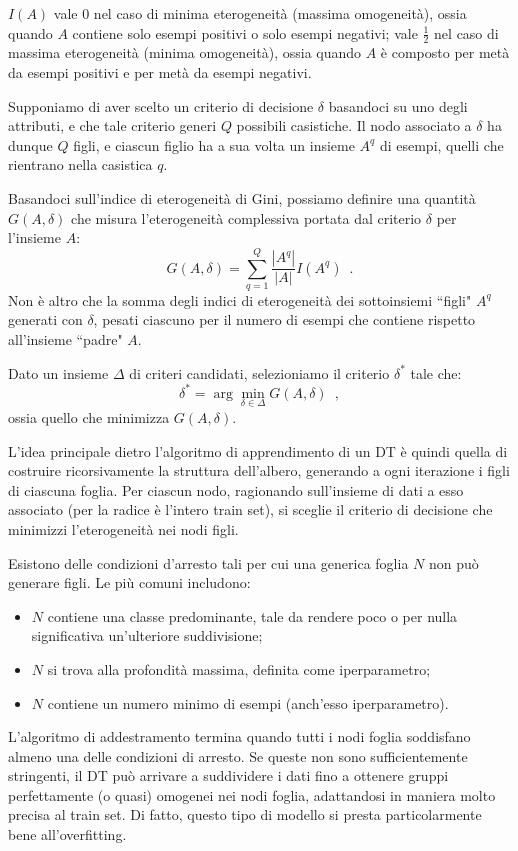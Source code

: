 $I(A)$ vale 0 nel caso di minima eterogeneità (massima omogeneità), ossia quando $A$ contiene solo esempi positivi o solo esempi negativi; vale $\frac{1}{2}$ nel caso di massima eterogeneità (minima omogeneità), ossia quando $A$ è composto per metà da esempi positivi e per metà da esempi negativi.

Supponiamo di aver scelto un criterio di decisione $\delta$ basandoci su uno degli attributi, e che tale criterio generi $Q$ possibili casistiche. Il nodo associato a $\delta$ ha dunque $Q$ figli, e ciascun figlio ha a sua volta un insieme $A^q$ di esempi, quelli che rientrano nella casistica $q$.

Basandoci sull'indice di eterogeneità di Gini, possiamo definire una quantità $G(A,\delta)$ che misura l'eterogeneità complessiva portata dal criterio $\delta$ per l'insieme $A$:
\begin{equation}
    G(A,\delta) = \sum_{q=1}^Q \frac{|A^q|}{|A|} I(A^q) \enspace .
\end{equation}
Non è altro che la somma degli indici di eterogeneità dei sottoinsiemi ``figli" $A^q$ generati con $\delta$, pesati ciascuno per il numero di esempi che contiene rispetto all'insieme ``padre" $A$.

Dato un insieme $\Delta$ di criteri candidati, selezioniamo il criterio $\delta^*$ tale che:
\begin{equation}
    \delta^* = \arg \min_{\delta \in \Delta} G(A,\delta) \enspace ,
\end{equation}
ossia quello che minimizza $G(A,\delta)$.


L'idea principale dietro l'algoritmo di apprendimento di un DT è quindi quella di costruire ricorsivamente la struttura dell’albero, generando a ogni iterazione i figli di ciascuna foglia.
Per ciascun nodo, ragionando sull'insieme di dati a esso associato (per la radice è l'intero train set), si sceglie il criterio di decisione che minimizzi l'eterogeneità nei nodi figli.

Esistono delle condizioni d'arresto tali per cui una generica foglia $N$ non può generare figli. Le più comuni includono:
\begin{itemize}
    \item $N$ contiene una classe predominante, tale da rendere poco o per nulla significativa un'ulteriore suddivisione; 

    \item $N$ si trova alla profondità massima, definita come iperparametro;

    \item $N$ contiene un numero minimo di esempi (anch'esso iperparametro).
\end{itemize}
L'algoritmo di addestramento termina quando tutti i nodi foglia soddisfano almeno una delle condizioni di arresto. Se queste non sono sufficientemente stringenti, il DT può arrivare a suddividere i dati fino a ottenere gruppi perfettamente (o quasi) omogenei nei nodi foglia, adattandosi in maniera molto precisa al train set. Di fatto, questo tipo di modello si presta particolarmente bene all'overfitting.

